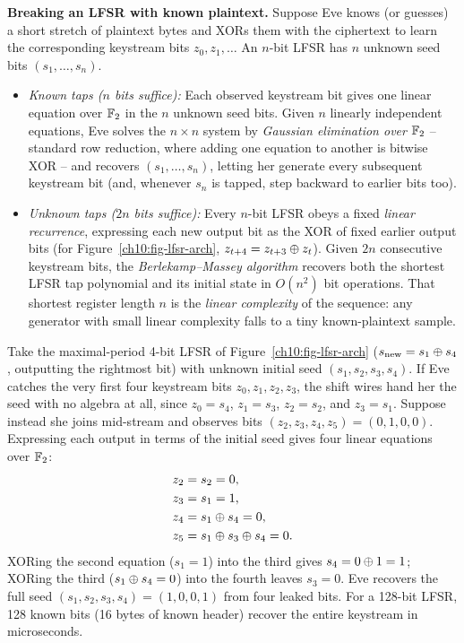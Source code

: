 \begin{attackbox}
\label{ch10:attack-lfsr}
\textbf{Breaking an LFSR with known plaintext.} Suppose Eve knows (or guesses) a short stretch of plaintext bytes and XORs them with the ciphertext to learn the corresponding keystream bits $z_0, z_1, \dots$ An $n$-bit LFSR has $n$ unknown seed bits $(s_1,\dots,s_n)$.
\begin{itemize}
  \item \emph{Known taps ($n$ bits suffice):} Each observed keystream bit gives one linear equation over $\mathbb{F}_2$ in the $n$ unknown seed bits. Given $n$ linearly independent equations, Eve solves the $n \times n$ system by \emph{Gaussian elimination over $\mathbb{F}_2$} -- standard row reduction, where adding one equation to another is bitwise XOR -- and recovers $(s_1,\dots,s_n)$, letting her generate every subsequent keystream bit (and, whenever $s_n$ is tapped, step backward to earlier bits too).
  \item \emph{Unknown taps ($2n$ bits suffice):} Every $n$-bit LFSR obeys a fixed \emph{linear recurrence}, expressing each new output bit as the XOR of fixed earlier output bits (for Figure~\ref{ch10:fig-lfsr-arch}, $z_{t+4} = z_{t+3} \oplus z_t$). Given $2n$ consecutive keystream bits, the \emph{Berlekamp--Massey algorithm} recovers both the shortest LFSR tap polynomial and its initial state in $O(n^2)$ bit operations. That shortest register length $n$ is the \emph{linear complexity} of the sequence: any generator with small linear complexity falls to a tiny known-plaintext sample.
\end{itemize}
\end{attackbox}

\begin{example}
\label{ch10:ex-lfsr-solve-demo}
Take the maximal-period 4-bit LFSR of Figure~\ref{ch10:fig-lfsr-arch} ($s_{\text{new}} = s_1 \oplus s_4$, outputting the rightmost bit) with unknown initial seed $(s_1, s_2, s_3, s_4)$. If Eve catches the very first four keystream bits $z_0, z_1, z_2, z_3$, the shift wires hand her the seed with no algebra at all, since $z_0 = s_4$, $z_1 = s_3$, $z_2 = s_2$, and $z_3 = s_1$. Suppose instead she joins mid-stream and observes bits $(z_2, z_3, z_4, z_5) = (0, 1, 0, 0)$. Expressing each output in terms of the initial seed gives four linear equations over $\mathbb{F}_2$:
\begin{align*}
  z_2 &= s_2 = 0, \\
  z_3 &= s_1 = 1, \\
  z_4 &= s_1 \oplus s_4 = 0, \\
  z_5 &= s_1 \oplus s_3 \oplus s_4 = 0.
\end{align*}
XORing the second equation ($s_1 = 1$) into the third gives $s_4 = 0 \oplus 1 = 1$; XORing the third ($s_1 \oplus s_4 = 0$) into the fourth leaves $s_3 = 0$. Eve recovers the full seed $(s_1,s_2,s_3,s_4) = (1,0,0,1)$ from four leaked bits. For a 128-bit LFSR, 128 known bits (16 bytes of known header) recover the entire keystream in microseconds.
\end{example}

